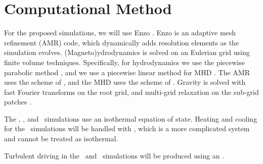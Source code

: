 \section{Computational Method}
\label{sec.method}

For the proposed simulations, we will use Enzo \citep{Collins10, Bryan14}.  Enzo
is an adaptive mesh refinement (AMR) code, which dynamically adds resolution
elements as the simulation evolves.  (Magneto)ydrodynamics is solved on an Eulerian grid
using finite volume techniques.  Specifically, for hydrodynamics we use the
piecewise parabolic method \citep{Colella84}, and we use a piecewise linear
method for MHD \citep{Li08}.  The AMR uses the scheme of \citet{Berger84}, and
the MHD uses the scheme of \citet{Balsara01}.  Gravity is solved with fast
Fourier transforms on the root grid, and multi-grid relaxation on the sub-grid
patches \citep{Bryan14}.  

The \nameTurbulence, \nameCores, and  \nameCMB\ simulations use an isothermal
equation of state.  Heating and cooling for the \nameGalaxies\ simulations will
be handled with , which is a more complicated system and cannot be
treated as isothermal.

Turbulent driving in the \nameTurbulence\ and \nameCMB\ simulations will be
produced
using an .




